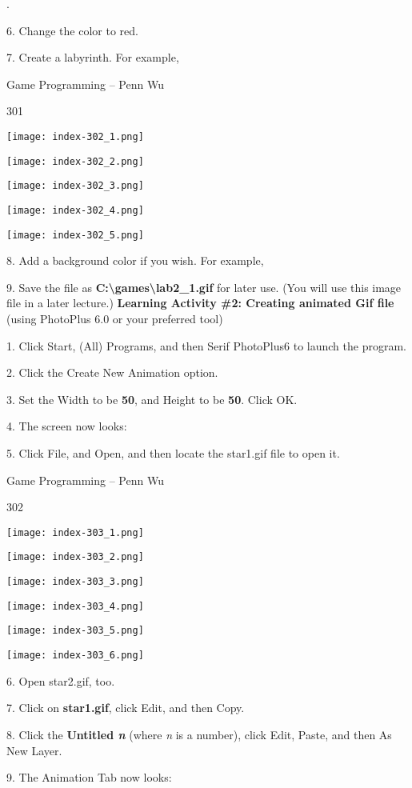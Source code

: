 \documentclass[
]{article}
\begin{document}
.

6. Change the color to red.

7. Create a labyrinth. For example,

Game Programming -- Penn Wu

301

\protect\hypertarget{index_split_015.htmlux5cux23p302}{}{}\texttt{[image: index-302\_1.png]}

\texttt{[image: index-302\_2.png]}

\texttt{[image: index-302\_3.png]}

\texttt{[image: index-302\_4.png]}

\texttt{[image: index-302\_5.png]}

8. Add a background color if you wish. For example,

9. Save the file as
\textbf{C:\textbackslash games\textbackslash lab2\_1.gif} for later use.
(You will use this image file in a later lecture.) \textbf{Learning
Activity \#2: Creating animated Gif file} (using PhotoPlus 6.0 or your
preferred tool) \textbf{}

1. Click Start, (All) Programs, and then Serif PhotoPlus6 to launch the
program.

2. Click the Create New Animation option.

3. Set the Width to be \textbf{50}, and Height to be \textbf{50}. Click
OK.

4. The screen now looks:

5. Click File, and Open, and then locate the star1.gif file to open it.

Game Programming -- Penn Wu

302

\protect\hypertarget{index_split_015.htmlux5cux23p303}{}{}\texttt{[image: index-303\_1.png]}

\texttt{[image: index-303\_2.png]}

\texttt{[image: index-303\_3.png]}

\texttt{[image: index-303\_4.png]}

\texttt{[image: index-303\_5.png]}

\texttt{[image: index-303\_6.png]}

6. Open star2.gif, too.

7. Click on \textbf{star1.gif}, click Edit, and then Copy.

8. Click the \textbf{Untitled \emph{n}} \textbf{} (where \emph{n} is a
number), click Edit, Paste, and then As New Layer.

9. The Animation Tab now looks:
\end{document}
